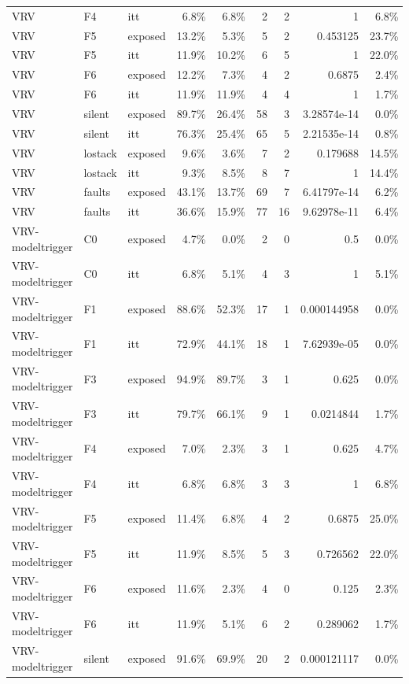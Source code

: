 \begin{tabular}{lllrrrrrr}
VRV & F4 & itt & 6.8\% & 6.8\% & 2 & 2 & 1 & 6.8\% \\
VRV & F5 & exposed & 13.2\% & 5.3\% & 5 & 2 & 0.453125 & 23.7\% \\
VRV & F5 & itt & 11.9\% & 10.2\% & 6 & 5 & 1 & 22.0\% \\
VRV & F6 & exposed & 12.2\% & 7.3\% & 4 & 2 & 0.6875 & 2.4\% \\
VRV & F6 & itt & 11.9\% & 11.9\% & 4 & 4 & 1 & 1.7\% \\
VRV & silent & exposed & 89.7\% & 26.4\% & 58 & 3 & 3.28574e-14 & 0.0\% \\
VRV & silent & itt & 76.3\% & 25.4\% & 65 & 5 & 2.21535e-14 & 0.8\% \\
VRV & lostack & exposed & 9.6\% & 3.6\% & 7 & 2 & 0.179688 & 14.5\% \\
VRV & lostack & itt & 9.3\% & 8.5\% & 8 & 7 & 1 & 14.4\% \\
VRV & faults & exposed & 43.1\% & 13.7\% & 69 & 7 & 6.41797e-14 & 6.2\% \\
VRV & faults & itt & 36.6\% & 15.9\% & 77 & 16 & 9.62978e-11 & 6.4\% \\
VRV-modeltrigger & C0 & exposed & 4.7\% & 0.0\% & 2 & 0 & 0.5 & 0.0\% \\
VRV-modeltrigger & C0 & itt & 6.8\% & 5.1\% & 4 & 3 & 1 & 5.1\% \\
VRV-modeltrigger & F1 & exposed & 88.6\% & 52.3\% & 17 & 1 & 0.000144958 & 0.0\% \\
VRV-modeltrigger & F1 & itt & 72.9\% & 44.1\% & 18 & 1 & 7.62939e-05 & 0.0\% \\
VRV-modeltrigger & F3 & exposed & 94.9\% & 89.7\% & 3 & 1 & 0.625 & 0.0\% \\
VRV-modeltrigger & F3 & itt & 79.7\% & 66.1\% & 9 & 1 & 0.0214844 & 1.7\% \\
VRV-modeltrigger & F4 & exposed & 7.0\% & 2.3\% & 3 & 1 & 0.625 & 4.7\% \\
VRV-modeltrigger & F4 & itt & 6.8\% & 6.8\% & 3 & 3 & 1 & 6.8\% \\
VRV-modeltrigger & F5 & exposed & 11.4\% & 6.8\% & 4 & 2 & 0.6875 & 25.0\% \\
VRV-modeltrigger & F5 & itt & 11.9\% & 8.5\% & 5 & 3 & 0.726562 & 22.0\% \\
VRV-modeltrigger & F6 & exposed & 11.6\% & 2.3\% & 4 & 0 & 0.125 & 2.3\% \\
VRV-modeltrigger & F6 & itt & 11.9\% & 5.1\% & 6 & 2 & 0.289062 & 1.7\% \\
VRV-modeltrigger & silent & exposed & 91.6\% & 69.9\% & 20 & 2 & 0.000121117 & 0.0\% \\

\end{tabular}
